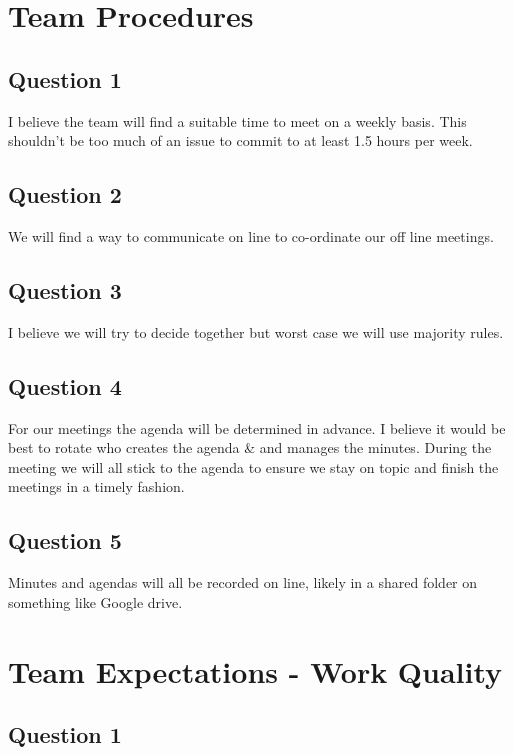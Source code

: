 \documentclass[fleqn, 12pt]{article}
\begin{document}
\section*{Team Procedures}

\subsection*{Question 1}

I believe the team will find a suitable time to meet on a weekly basis. This shouldn't be too much of an issue to commit to at least 1.5 hours per week.

\subsection*{Question 2}

We will find a way to communicate on line to co-ordinate our off line meetings.

\subsection*{Question 3}

I believe we will try to decide together but worst case we will use majority rules.

\subsection*{Question 4}

For our meetings the agenda will be determined in advance. I believe it would be best to rotate who creates the agenda \& and manages the minutes. During the meeting we will all stick to the agenda to ensure we stay on topic and finish the meetings in a timely fashion.

\subsection*{Question 5}

Minutes and agendas will all be recorded on line, likely in a shared folder on something like Google drive.

\section*{Team Expectations - Work Quality}

\subsection*{Question 1}
\end{document}

